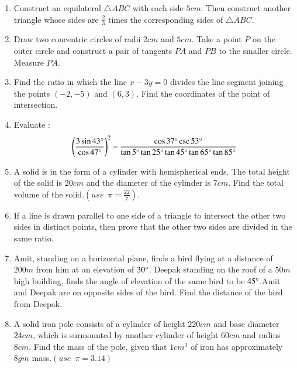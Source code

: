 \documentclass[12pt,-letter paper]{article}
\providecommand{\brak}[1]{\ensuremath{\left(#1\right)}}
\begin{document}
\begin{enumerate}
\item Construct an equilateral $\triangle ABC$ with each side $5 cm$. Then construct another triangle whose sides are $\frac{2}{3}$ times the corresponding sides of $\triangle ABC$.

\item Draw two concentric circles of radii $2 cm$ and $5 cm$. Take a point $P$ on the outer circle and construct a pair of tangents $PA$ and $PB$ to the smaller circle. Measure $PA$.   

\item Find the ratio in which the line $x-3y = 0$ divides the line segment joining the points $\brak{ -2, -5}$ and $\brak{6, 3}$. Find the coordinates of the point of intersection.

\item Evaluate :
\begin{align*}
\left(\frac{3\sin 43\degree}{\cos 47\degree}\right)^2 - \frac{\cos 37\degree \csc 53\degree}{\tan 5\degree \tan 25\degree \tan 45\degree \tan 65\degree \tan 85\degree}
\end{align*}


\item A solid is in the form of a cylinder with hemispherical ends. The total
height of the solid is $20 cm$ and the diameter of the cylinder is $7 cm$. Find the total volume of the solid.$(use \hspace{6pt}\pi = \frac{22}{7})$.


\item If a line is drawn parallel to one side of a triangle to intersect the  other two sides in distinct points, then prove that the other two sides are divided in the same ratio.
 
\item Amit, standing on a horizontal plane, finds a bird flying at a distance of $200 m$ from him at an elevation of $30\degree$. Deepak standing on the roof of a $50 m$ high building, finds the angle of elevation of the same bird to be $45\degree$.Amit and Deepak are on opposite sides of the bird. Find the distance of the bird from Deepak.

\item A solid iron pole consists of a cylinder of height $220 cm$ and base diameter $24 cm$, which is surmounted by another cylinder of height $60 cm$ and radius $8 cm$. Find the mass of the pole, given that $1 cm^3$ of iron has approximately $8 gm$ mass.$(use\hspace{6pt} \pi =3.14)$


\end{enumerate}
\end{document}
